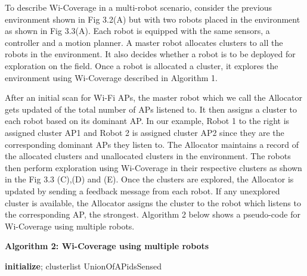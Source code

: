 To describe Wi-Coverage in a multi-robot scenario, consider the previous environment shown in Fig 3.2(A) but with two robots placed in the environment as shown in Fig 3.3(A). Each robot is equipped with the same sensors, a controller and a motion planner. A master robot allocates clusters to all the robots in the environment. It also decides whether a robot is to be deployed for exploration on the field. Once a robot is allocated a cluster, it explores the environment using Wi-Coverage described in Algorithm 1. 
\par After an initial scan for Wi-Fi APs, the master robot which we call the Allocator gets updated of the total number of APs listened to. It then assigns a cluster to each robot based on its dominant AP. In our example, Robot 1 to the right is assigned cluster AP1 and Robot 2 is assigned cluster AP2 since they are the corresponding dominant APs they listen to. The Allocator maintains a record of the allocated clusters and unallocated clusters in the environment. The robots then perform exploration using Wi-Coverage in their respective clusters as shown in the Fig 3.3 (C),(D) and (E). Once the clusters are explored, the Allocator is updated by sending a feedback message from each robot. If any unexplored cluster is available, the Allocator assigns the cluster to the robot which listens to the corresponding AP, the strongest. Algorithm 2 below shows a pseudo-code for Wi-Coverage using multiple robots.
\vspace{1.5em}

\noindent\textbf{Algorithm 2: Wi-Coverage using multiple robots}

\begin{algorithm}[H]
\textbf{initialize};
clusterlist \gets UnionOfAPidsSensed\\
\end{algorithm}

